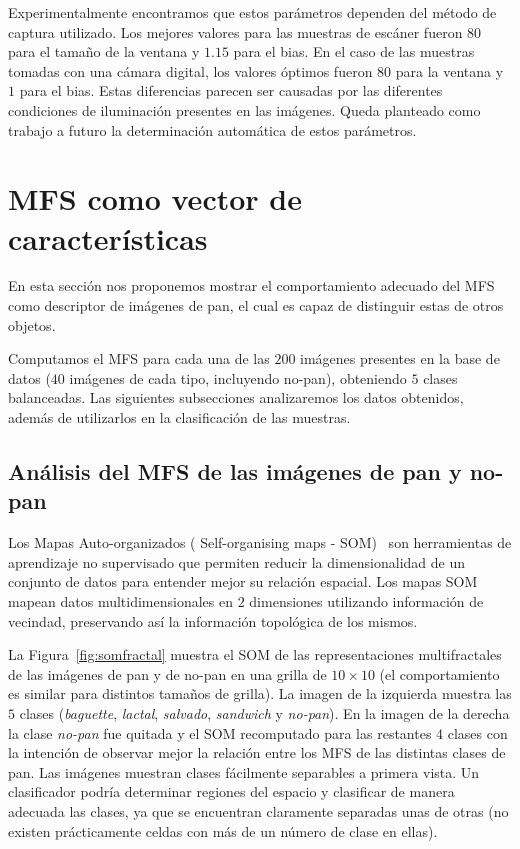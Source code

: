 Experimentalmente encontramos que estos parámetros dependen del método de captura utilizado. Los mejores valores para las muestras de escáner fueron $80$ para el tamaño de la ventana y $1.15 $ para el bias. En el caso de las muestras tomadas con una cámara digital, los valores óptimos fueron $80$ para la ventana y $1$ para el bias.  Estas diferencias parecen ser causadas por las diferentes condiciones de iluminación presentes en las imágenes. Queda planteado como trabajo a futuro la determinación automática de estos parámetros.

\section{MFS como vector de caracter\'isticas}

En esta sección nos proponemos mostrar el comportamiento adecuado del MFS como descriptor de imágenes de pan, el cual es capaz de distinguir estas de otros objetos.

Computamos el MFS para cada una de las $200$ imágenes presentes en la base de datos ($40$ imágenes de cada tipo, incluyendo no-pan), obteniendo $5$ clases balanceadas.  Las siguientes subsecciones analizaremos los datos obtenidos, además de utilizarlos en la clasificación de las muestras.

\subsection{Análisis del MFS de las imágenes de pan y no-pan}

Los Mapas Auto-organizados ( Self-organising maps -  SOM)~\cite{Kohonen2001} son herramientas de aprendizaje no supervisado que permiten reducir la dimensionalidad de un conjunto de datos para entender mejor su relación espacial. Los mapas SOM mapean datos multidimensionales en $2$ dimensiones utilizando información de vecindad, preservando así la información topológica de los mismos.

La Figura~\ref{fig:somfractal} muestra el  SOM de las representaciones multifractales de las imágenes de pan y de no-pan en una grilla de $10\times 10$ (el comportamiento es similar para distintos tamaños de grilla). La imagen de la izquierda muestra las $5$ clases ({\em baguette}, {\em lactal}, {\em salvado}, {\em sandwich} y {\em no-pan}). En la imagen de la derecha la clase {\em no-pan} fue quitada y el SOM recomputado para las restantes $4$ clases con la intención de observar mejor la relación entre los MFS de las distintas clases de pan. Las imágenes muestran clases fácilmente separables a primera vista. Un clasificador podría determinar regiones del espacio y clasificar de manera adecuada las clases, ya que se encuentran claramente separadas unas de otras (no existen prácticamente celdas con más de un número de clase en ellas).

